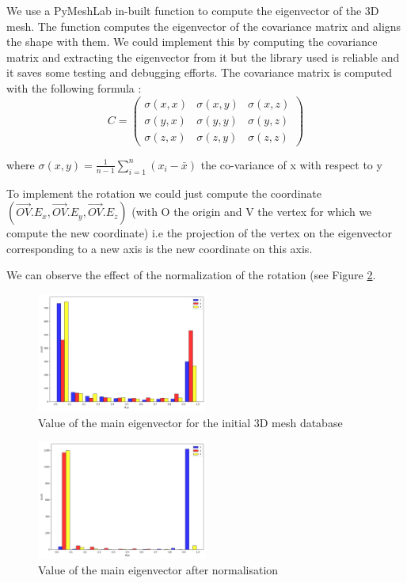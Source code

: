\documentclass[10pt,twocolumn,letterpaper]{article}
\begin{document}
	We use a PyMeshLab in-built function to compute the eigenvector of the 3D mesh. The function computes the eigenvector of the covariance matrix and aligns the shape with them. We could implement this by computing the covariance matrix and extracting the eigenvector from it but the library used is reliable and it saves some testing and debugging efforts. The covariance matrix is computed with the following formula :
	$$ C = \begin{pmatrix}
   \sigma(x,x) & \sigma(x,y) & \sigma(x,z) \\
   \sigma(y,x) & \sigma(y,y) & \sigma(y,z) \\
   \sigma(z,x) & \sigma(z,y) & \sigma(z,z)
\end{pmatrix} $$

where $ \sigma(x,y) = \frac{1}{n-1} \sum\limits_{i=1}^n ( x_i - \bar{x} ) $ the co-variance of x with respect to y
	
	To  implement the rotation we could just compute the coordinate $(\overrightarrow{OV}.E_x, \overrightarrow{OV}.E_y, \overrightarrow{OV}.E_z)$ (with O the origin and V the vertex for which we compute the new coordinate) i.e the projection of the vertex on the eigenvector corresponding to a new axis is the new coordinate on this axis.
	
	We can observe the effect of the normalization of the rotation (see Figure \ref{fig:PCA-after}.

\begin{figure}[h!]
\begin{center}
  \includegraphics[width=0.5\textwidth]{picture/Initial pca}
  \caption{Value of the main eigenvector for the initial 3D mesh database}
  \label{fig:PCA-before}
  \end{center}
\end{figure}

\begin{figure}[h!]
\begin{center}
  \includegraphics[width=0.5\textwidth]{picture/Normalised pca}
  \caption{Value of the main eigenvector after normalisation}
  \label{fig:PCA-after}
  \end{center}
\end{figure}
	
\end{document}
